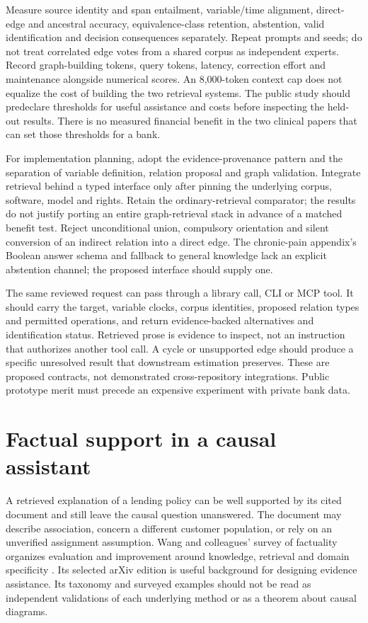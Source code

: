 Measure source identity and span entailment, variable/time alignment, direct-edge
and ancestral accuracy, equivalence-class retention, abstention, valid
identification and decision consequences separately. Repeat prompts and seeds;
do not treat correlated edge votes from a shared corpus as independent experts.
Record graph-building tokens, query tokens, latency, correction effort and
maintenance alongside numerical scores. An 8,000-token context cap does not
equalize the cost of building the two retrieval systems. The public study should
predeclare thresholds for useful assistance and costs before inspecting the
held-out results. There is no measured financial benefit in the two clinical
papers that can set those thresholds for a bank.

For implementation planning, adopt the evidence-provenance pattern and the
separation of variable definition, relation proposal and graph validation.
Integrate retrieval behind a typed interface only after pinning the underlying
corpus, software, model and rights. Retain the ordinary-retrieval comparator;
the results do not justify porting an entire graph-retrieval stack in advance
of a matched benefit test. Reject unconditional union, compulsory orientation
and silent conversion of an indirect relation into a direct edge. The chronic-pain
appendix's Boolean answer schema and fallback to general knowledge lack an
explicit abstention channel; the proposed interface should supply one.
\cite{exec22_domain_lin}

The same reviewed request can pass through a library call, CLI or MCP tool. It
should carry the target, variable clocks, corpus identities, proposed relation
types and permitted operations, and return evidence-backed alternatives and
identification status. Retrieved prose is evidence to inspect, not an instruction
that authorizes another tool call. A cycle or unsupported edge should produce a
specific unresolved result that downstream estimation preserves. These are
proposed contracts, not demonstrated cross-repository integrations. Public
prototype merit must precede an expensive experiment with private bank data.


\section{Factual support in a causal assistant}
\label{exec22:fact-scope}

A retrieved explanation of a lending policy can be well supported by its cited
document and still leave the causal question unanswered. The document may
describe association, concern a different customer population, or rely on an
unverified assignment assumption. Wang and colleagues' survey of factuality
organizes evaluation and improvement around knowledge, retrieval and domain
specificity \cite{exec22_factuality_wang}. Its selected arXiv edition is useful
background for designing evidence assistance. Its taxonomy and surveyed
examples should not be read as independent validations of each underlying
method or as a theorem about causal diagrams.

